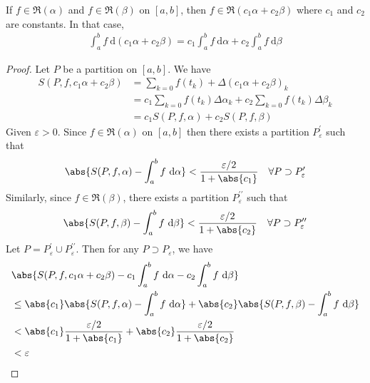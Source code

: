 \documentclass[thmcnt=section, 12pt]{elegantbook}
\begin{document}
\begin{theorem}
    If $f \in \mathfrak{R}(\alpha)$ and $f \in \mathfrak{R}(\beta)$ on $[a,b]$, then $f \in \mathfrak{R}(c_1 \alpha + c_2 \beta)$ where $c_1$ and $c_2$ are constants. In that case, 
    \begin{align*}
        \int_a^b f \ \mathrm{d}(c_1 \alpha + c_2 \beta)
        = c_1 \int_a^b f \ \mathrm{d}\alpha
        + c_2 \int_a^b f \ \mathrm{d}\beta
    \end{align*}
\end{theorem}

\begin{proof}
    Let $P$ be a partition on $[a,b]$. We have 
    \begin{align*}
        S(P, f, c_1 \alpha + c_2 \beta)
        &= \sum_{k=0} f(t_k) + \Delta(c_1 \alpha + c_2 \beta)_k \\ 
        &= c_1 \sum_{k=0} f(t_k) \Delta\alpha_k
        + c_2 \sum_{k=0} f(t_k) \Delta\beta_k \\ 
        &= c_1 S(P, f, \alpha) + c_2 S(P, f, \beta)
    \end{align*}
    Given $\varepsilon > 0$. Since $f \in \mathfrak{R}(\alpha)$ on $[a,b]$ then there exists a partition $P_\varepsilon^{\prime}$
    such that 
    \begin{align*}
        \abs{S(P, f, \alpha) - \int_a^b f \ \mathrm{d}\alpha} < \frac{\varepsilon / 2}{1 + \abs{c_1}}
        \quad \forall P \supset P_\varepsilon^{\prime}
    \end{align*}
    Similarly, since $f \in \mathfrak{R}(\beta)$, there exists a partition $P_\varepsilon^{\prime\prime}$ such that 
    \begin{align*}
        \abs{S(P, f, \beta) - \int_a^b f \ \mathrm{d}\beta} < \frac{\varepsilon / 2}{1 + \abs{c_2}}
        \quad \forall P \supset P_\varepsilon^{\prime\prime}
    \end{align*}
    Let $P = P_\varepsilon^{\prime} \cup P_\varepsilon^{\prime\prime}$. Then for any $P \supset P_\varepsilon$, we have 
    \begin{align*}
        &\abs{
            S(P, f, c_1 \alpha + c_2 \beta) 
            - c_1 \int_a^b f \ \mathrm{d}\alpha
            - c_2 \int_a^b f \ \mathrm{d}\beta
        } \\
        &\leq \abs{c_1} \abs{S(P,f,\alpha) - \int_a^b f \ \mathrm{d}\alpha}
        + \abs{c_2} \abs{S(P,f,\beta) - \int_a^b f \ \mathrm{d}\beta} \\ 
        &< \abs{c_1} \frac{\varepsilon / 2}{1 + \abs{c_1}}
        + \abs{c_2} \frac{\varepsilon / 2}{1 + \abs{c_2}} \\ 
        &< \varepsilon
    \end{align*}
\end{proof}
\end{document}
